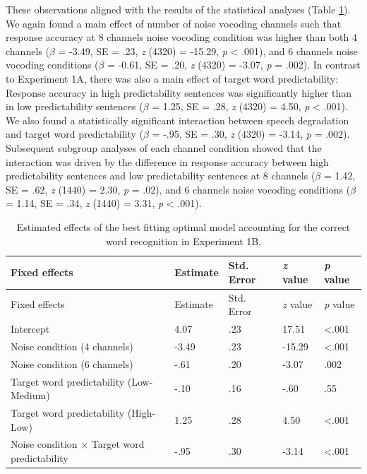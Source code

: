 \documentclass[a4paper, nobind]{templates/ociamthesis}
\begin{document}
These observations aligned with the results of the statistical analyses (Table \ref{results1b}).
We again found a main effect of number of noise vocoding channels such that response accuracy at 8 channels noise vocoding condition was higher than both 4 channels (\(\beta\) = -3.49, SE = .23, \emph{z} (4320) = -15.29, \emph{p} \textless{} .001), and 6 channels noise vocoding conditions (\(\beta\) = -0.61, SE = .20, \emph{z} (4320) = -3.07, \emph{p} = .002).
In contrast to Experiment 1A, there was also a main effect of target word predictability:
Response accuracy in high predictability sentences was significantly higher than in low predictability sentences (\(\beta\) = 1.25, SE = .28, \emph{z} (4320) = 4.50, \emph{p} \textless{} .001).
We also found a statistically significant interaction between speech degradation and target word predictability (\(\beta\) = -.95, SE = .30, \emph{z} (4320) = -3.14, \emph{p} = .002).
Subsequent subgroup analyses of each channel condition showed that the interaction was driven by the difference in response accuracy between high predictability sentences and low predictability sentences at 8 channels (\(\beta\) = 1.42, SE = .62, \emph{z} (1440) = 2.30, \emph{p} = .02), and 6 channels noise vocoding conditions (\(\beta\) = 1.14, SE = .34, \emph{z} (1440) = 3.31, \emph{p} \textless{} .001).

\begin{longtable}[]{@{}lllll@{}}
\caption{Estimated effects of the best fitting optimal model accounting
for the correct word recognition in Experiment 1B.}
\label{results1b}
\tabularnewline
\toprule
Fixed effects & Estimate & Std. Error & \emph{z} value & \emph{p}
value \\
\midrule
\endfirsthead
\toprule
Fixed effects & Estimate & Std. Error & \emph{z} value & \emph{p}
value \\
\midrule
\endhead
Intercept & 4.07 & .23 & 17.51 & \textless.001 \\
Noise condition (4 channels) & -3.49 & .23 & -15.29 & \textless.001 \\
Noise condition (6 channels) & -.61 & .20 & -3.07 & .002 \\
Target word predictability (Low-Medium) & -.10 & .16 & -.60 & .55 \\
Target word predictability (High-Low) & 1.25 & .28 & 4.50 &
\textless.001 \\
Noise condition $\times$ Target word predictability & -.95 & .30 & -3.14 &
\textless.001 \\
\bottomrule
\end{longtable}
\end{document}
